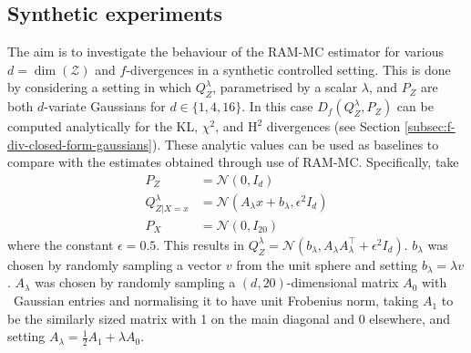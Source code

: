 \subsection{Synthetic experiments}\label{section:synth-exps}
The aim is to investigate the behaviour of the RAM-MC estimator for various $d=\dim(\mathcal{Z})$ and $f$-divergences in a synthetic controlled setting. 
This is done by considering a setting in which $Q^{\lambda}_Z$, parametrised by a scalar $\lambda$, and $P_Z$ are both $d$-variate Gaussians for $d\in\{1, 4, 16\}$.
In this case $D_f(Q^\lambda_Z, P_Z)$ can be computed analytically for the KL, $\chi^2$, and $\mathrm{H}^2$ divergences (see Section \ref{subsec:f-div-closed-form-gaussians}).
These analytic values can be used as baselines to compare with the estimates obtained through use of RAM-MC. 
Specifically, take 
\begin{align*}
P_Z &= \mathcal{N}(0, I_d) \\
Q^\lambda_{Z|X=x} &= \mathcal{N}\left(A_\lambda x + b_\lambda, \epsilon^2 I_d \right) \\
P_X &= \mathcal{N}\left(0, I_{20} \right)
\end{align*}
where the constant $\epsilon=0.5$.
This results in $Q^\lambda_Z = \mathcal{N}\left(b_\lambda,  A_\lambda A_\lambda^\intercal + \epsilon^2 I_d \right)$. 
$b_\lambda$ was chosen by randomly sampling a vector $v$ from the unit sphere and setting $b_\lambda = \lambda v$. 
$A_\lambda$ was chosen by randomly sampling a $(d,20)$-dimensional matrix $A_0$ with \iid~Gaussian entries and normalising it to have unit Frobenius norm, taking $A_1$ to be the similarly sized matrix with 1 on the main diagonal and 0 elsewhere, and setting $A_\lambda = \frac{1}{2}A_1 + \lambda A_0$.


